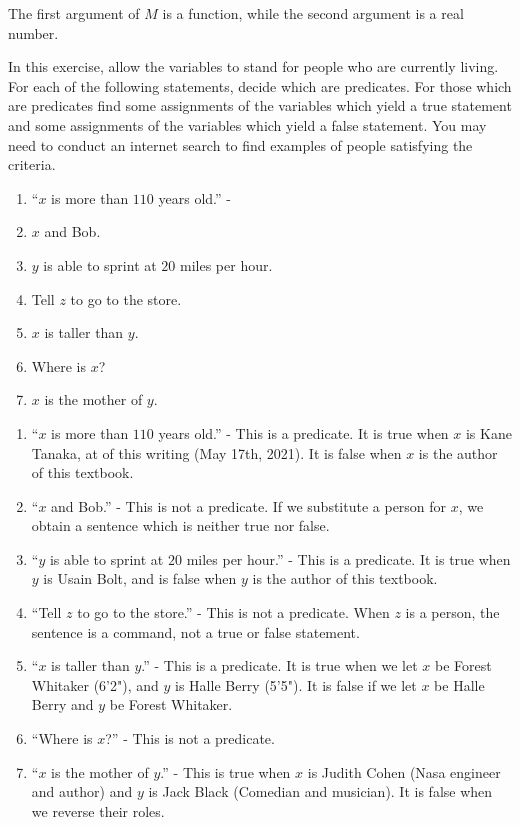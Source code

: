 The first argument of $M$ is a function, while the second argument is a real number.


\begin{xca} In this exercise, allow the variables to stand for people who are currently living.  For each of the following statements, decide which are predicates.  For those which are predicates find some assignments of the variables which yield a true statement and some assignments of the variables which yield a false statement.  You may need to conduct an internet search to find examples of people satisfying the criteria.
		\begin{enumerate}
	\item ``$x$ is more than $110$ years old.'' - 
	\item $x$ and Bob.
	\item $y$ is able to sprint at $20$ miles per hour.
	\item Tell $z$ to go to the store.
	\item $x$ is taller than $y$.
	\item Where is $x$?
	\item $x$ is the mother of $y$.
\end{enumerate}

\end{xca}

\begin{solutions}


	\begin{enumerate}
	\item ``$x$ is more than $110$ years old.'' - This is a predicate.  It is true when $x$ is Kane Tanaka, at of this writing (May 17th, 2021).  It is false when $x$ is the author of this textbook.
	\item ``$x$ and Bob.'' - This is not a predicate.  If we substitute a person for $x$, we obtain a sentence which is neither true nor false.
	\item ``$y$ is able to sprint at $20$ miles per hour.'' - This is a predicate.  It is true when $y$ is Usain Bolt, and is false when $y$ is the author of this textbook.
	\item ``Tell $z$ to go to the store.'' - This is not a predicate.  When $z$ is a person, the sentence is a command, not a true or false statement. 
	\item ``$x$ is taller than $y$.'' - This is a predicate.  It is true when we let $x$ be Forest Whitaker (6'2"), and $y$ is Halle Berry (5'5").  It is false if we let $x$ be Halle Berry and $y$ be Forest Whitaker.
	\item ``Where is $x$?'' - This is not a predicate.
	\item ``$x$ is the mother of $y$.'' - This is true when $x$ is Judith Cohen (Nasa engineer and author) and $y$ is Jack Black (Comedian and musician).  It is false when we reverse their roles.
\end{enumerate}
		
	\end{solutions}

